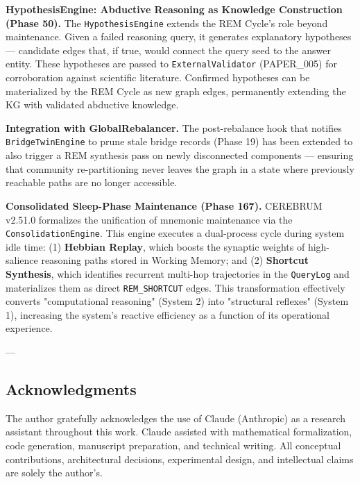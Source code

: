 \textbf{HypothesisEngine: Abductive Reasoning as Knowledge Constr\-uction (Phase 50).} The \texttt{HypothesisEngine} extends the REM Cycle's role beyond maintenance. Given a failed reasoning query, it generates explanatory hypotheses — candidate edges that, if true, would connect the query seed to the answer entity. These hypotheses are passed to \texttt{ExternalValidator} (PAPER\_005) for corro\-boration against scientific literature. Confirmed hypotheses can be mater\-ialized by the REM Cycle as new graph edges, permanently extending the KG with validated abductive knowledge.

\textbf{Integration with GlobalRebalancer.} The post-rebalance hook that notifies \texttt{BridgeTwinEngine} to prune stale bridge records (Phase 19) has been extended to also trigger a REM synthesis pass on newly disco\-nnected components — ensuring that community re-parti\-tioning never leaves the graph in a state where previously reachable paths are no longer accessible.

\textbf{Consol\-idated Sleep-Phase Maintenance (Phase 167).} CEREBRUM v2.51.0 formalizes the unification of mnemonic maintenance via the \texttt{ConsolidationEngine}. This engine executes a dual-process cycle during system idle time: (1) \textbf{Hebbian Replay}, which boosts the synaptic weights of high-salience reasoning paths stored in Working Memory; and (2) \textbf{Shortcut Synthesis}, which identifies recurrent multi-hop traje\-ctories in the \texttt{QueryLog} and mater\-ializes them as direct \texttt{REM\_SHORTCUT} edges. This trans\-formation effectively converts "compu\-tational reasoning" (System 2) into "structural reflexes" (System 1), increasing the system's reactive efficiency as a function of its operational experience.

---
\subsection{Acknow\-ledgments}

The author gratefully ackno\-wledges the use of Claude (Anthropic) as a research assistant throughout this work. Claude assisted with mathe\-matical forma\-lization, code generation, manuscript preparation, and technical writing. All conceptual contr\-ibutions, archi\-tectural decisions, exper\-imental design, and intel\-lectual claims are solely the author's.

